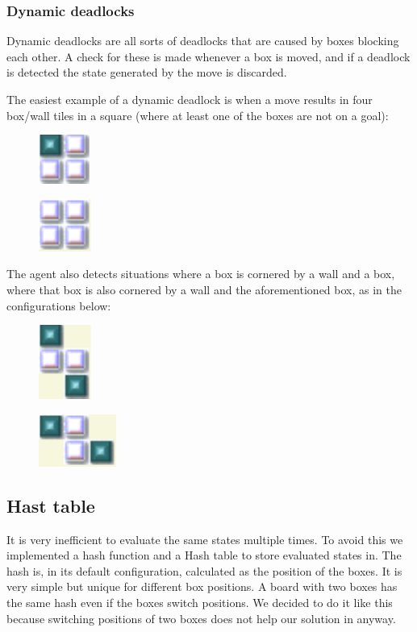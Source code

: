 \documentclass[article,11pt]{article}
\begin{document}
\subsubsection{Dynamic deadlocks}

Dynamic deadlocks are all sorts of deadlocks that are caused by boxes
blocking each other. A check for these is made whenever a box is
moved, and if a deadlock is detected the state generated by the move
is discarded.

The easiest example of a dynamic deadlock is when a move results in
four box/wall tiles in a square (where at least one of the boxes are
not on a goal):
\begin{figure}[h]
\includegraphics{dd1.pdf}
\end{figure}
\begin{figure}[h]
\includegraphics{dd2.pdf}
\end{figure}
The agent also detects situations where a box is cornered by a wall
and a box, where that box is also cornered by a wall and the
aforementioned box, as in the configurations below:
\begin{figure}[h]
\includegraphics{dd3.pdf}
\end{figure}
\begin{figure}[h]
\includegraphics{dd4.pdf}
\end{figure}
\subsection{Hast table}
It is very inefficient to evaluate the same states multiple times. To
avoid this we implemented a hash function and a Hash table to store
evaluated states in. The hash is, in its default configuration,
calculated as the position of the boxes. It is very simple but unique
for different box positions. A board with two boxes has the same hash
even if the boxes switch positions. We decided to do it like this
because switching positions of two boxes does not help our solution in
anyway.
\end{document}
